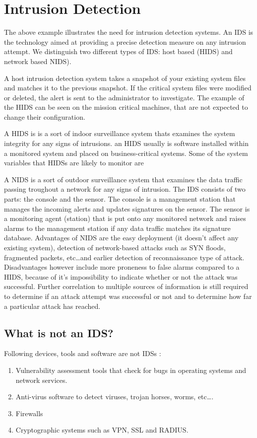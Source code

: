 \section{Intrusion Detection}

The \label{sec:ID} above example illustrates the need for intrusion detection systems. An IDS is the technology aimed at providing a precise detection measure on any intrusion attempt. We distinguish two different types of IDS: host based (HIDS) and network based NIDS).

A host intrusion detection system takes a snapshot of your existing system files and matches it to the previous snapshot. If the critical system files were modified or deleted, the alert is sent to the administrator to investigate. The example of the HIDS can be seen on the mission critical machines, that are not expected to change their configuration.

A HIDS is  is a sort of indoor surveillance system thats examines the system integrity for any signs of intrusions. an HIDS usually is software installed within a monitored system and placed on business-critical systems. Some of the system variables that HIDSs are likely to monitor are

A NIDS is a sort of outdoor surveillance system that examines the data traffic passing troughout a network for any signs of intrusion. The IDS consists of two parts: the console and the sensor. The console is a management station that manages the incoming alerts and updates signatures on the sensor. The sensor is a monitoring agent (station) that is put onto any monitored network and raises alarms to the management station if any data traffic matches its signature database. Advantages of NIDS are the easy deployment (it doesn't affect any existing system), detection of network-based attacks such as SYN floods, fragmented packets, etc\ldots and earlier detection of reconnaissance type of attack. Disadvantages however include more proneness to false alarms compared to a HIDS, because of it's impossibility to indicate whether or not the attack was successful. Further correlation to multiple sources of information is still required to determine if an attack attempt was successful or not and to determine how far a particular attack has reached.

\subsection{What is not an IDS?}

Following devices, tools and software are not IDSs \citep{windowssecurity}:
\begin{enumerate}
\item Vulnerability assessment tools that check for bugs in operating systems and network services.
\item Anti-virus software to detect viruses, trojan horses, worms, etc\ldots.
\item Firewalls
\item Cryptographic systems such as VPN, SSL and RADIUS.
\end{enumerate}


